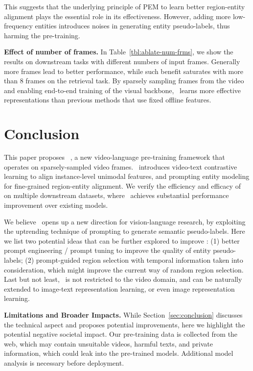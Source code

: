 \documentclass[10pt,twocolumn,letterpaper]{article}
\begin{document}
This suggests that the underlying principle of PEM to learn better region-entity alignment plays the essential role in its effectiveness.
However, adding more low-frequency entities introduces noises in generating entity pseudo-labels, thus harming the pre-training.

\noindent\textbf{Effect of number of frames.} 
In Table~\ref{tbl:ablate-num-frms}, we show the results on downstream tasks with different numbers of input frames.
Generally more frames lead to better performance, while such benefit saturates with more than 8 frames on the retrieval task.
By sparsely sampling frames from the video and enabling end-to-end training of the visual backbone, \name~learns more effective representations than previous methods that use fixed offline features.


 


\vspace{-0.5ex}
\section{Conclusion}
\vspace{-0.5ex}
\label{sec:conclusion}
This paper proposes \name~, a new video-language pre-training framework that operates on sparsely-sampled video frames.
\name~introduces video-text contrastive learning to align instance-level unimodal features, and prompting entity modeling for fine-grained region-entity alignment. 
We verify the efficiency and efficacy of \name~ on multiple downstream datasets,
where \name~achieves substantial performance improvement over existing models.

We believe \name~opens up a new direction for vision-language research, by exploiting the uptrending technique of prompting to generate semantic pseudo-labels.
Here we list two potential ideas that can be further explored to improve \name:
(1) better prompt engineering / prompt tuning to improve the quality of entity pseudo-labels; 
(2) prompt-guided region selection with temporal information taken into consideration, which might improve the current way of random region selection.
Last but not least, \name~is not restricted to the video domain, and can be naturally extended to image-text representation learning, or even image representation learning.

\noindent\textbf{Limitations and Broader Impacts.}
While Section~\ref{sec:conclusion} discusses the technical aspect and proposes potential improvements,
here we highlight the potential negative societal impact.
Our pre-training data is collected from the web, which may contain unsuitable videos, harmful texts, and private information,
which could leak into the pre-trained models.
Additional model analysis is necessary before deployment. 
\end{document}
